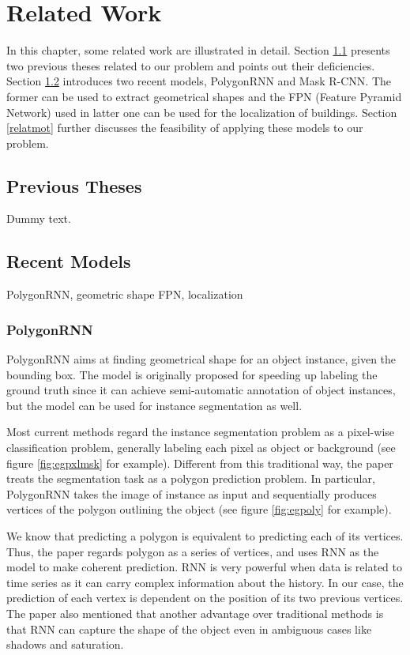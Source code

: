 \chapter{Related Work}

In this chapter, some related work are illustrated in detail. Section \ref{relatpre} presents two previous theses related to our problem and points out their deficiencies. Section \ref{relatrec} introduces two recent models, PolygonRNN and Mask R-CNN. The former can be used to extract geometrical shapes and the FPN (Feature Pyramid Network) used in latter one can be used for the localization of buildings. Section \ref{relatmot} further discusses the feasibility of applying these models to our problem.

\section{Previous Theses}\label{relatpre}



Dummy text.

\section{Recent Models}\label{relatrec}


PolygonRNN, geometric shape
FPN, localization

\subsection{PolygonRNN}\label{relatpoly}
PolygonRNN aims at finding geometrical shape for an object instance, given the bounding box. The model is originally proposed for speeding up labeling the ground truth since it can achieve semi-automatic annotation of object instances, but the model can be used for instance segmentation as well.

Most current methods regard the instance segmentation problem as a pixel-wise classification problem, generally labeling each pixel as object or background (see figure \ref{fig:egpxlmsk} for example). Different from this traditional way, the paper treats the segmentation task as a polygon prediction problem. In particular, PolygonRNN takes the image of instance as input and sequentially produces vertices of the polygon outlining the object (see figure \ref{fig:egpoly} for example).



We know that predicting a polygon is equivalent to predicting each of its vertices. Thus, the paper regards polygon as a series of vertices, and uses RNN as the model to make coherent prediction. RNN is very powerful when data is related to time series as it can carry complex information about the history. In our case, the prediction of each vertex is dependent on the position of its two previous vertices. The paper also mentioned that another advantage over traditional methods is that RNN can capture the shape of the object even in ambiguous cases like shadows and saturation.

